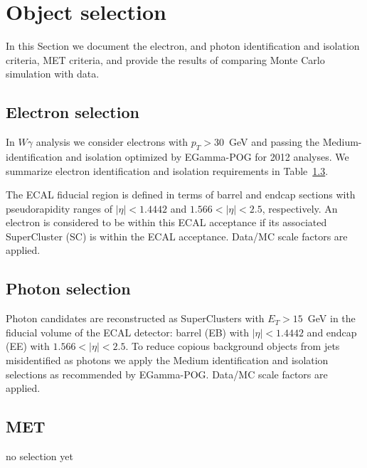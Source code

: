 \section{Object selection}
\label{sec:ObjectSelection}
In this Section we document the electron, 
and photon identification and isolation criteria, MET criteria, and provide the
results of comparing Monte Carlo simulation with data.


\subsection{Electron selection}
\label{sec:eid}
In $W\gamma$ analysis we consider electrons with $p_T > 30$~GeV and passing
the Medium-identification and isolation optimized by EGamma-POG for 2012 analyses.
We summarize electron identification and isolation requirements in Table~\ref{}.

The ECAL fiducial region is defined in terms of barrel and endcap
sections with pseudorapidity ranges of $|\eta| < 1.4442$ and  
$1.566 < |\eta| < 2.5$, respectively. An electron is considered
to be within this ECAL acceptance if its associated SuperCluster (SC) is
within the ECAL acceptance.
Data/MC scale factors are applied.


\subsection{Photon selection}
Photon candidates are reconstructed as SuperClusters with 
$E_{T} > 15$~GeV in the fiducial volume of the ECAL detector:
barrel (EB) with $|\eta|<1.4442$ and endcap (EE) with 
$1.566 < |\eta| < 2.5$. To reduce copious background objects from jets misidentified as photons 
we apply the Medium identification and isolation selections as recommended by EGamma-POG.
Data/MC scale factors are applied.

\subsection{MET}
no selection yet


